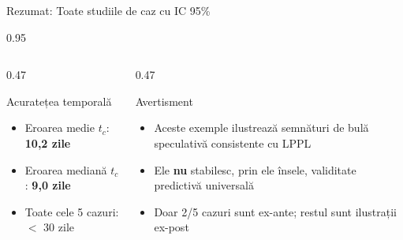\documentclass[9pt, aspectratio=169, t]{beamer}
\begin{document}
\begin{frame}{Rezumat: Toate studiile de caz cu IC 95\%}
\begin{cminipage}{0.95\textwidth}
{    \vspace{1mm}
    }
    {\footnotesize
    \begin{columns}[T]
        \begin{column}{0.47\textwidth}
            \begin{block}{Acuratețea temporală}
                \begin{itemize}\setlength{\itemsep}{0pt}
                    \item Eroarea medie $t_c$: \textbf{10,2 zile}
                    \item Eroarea mediană $t_c$: \textbf{9,0 zile}
                    \item Toate cele 5 cazuri: $<$ 30 zile
                \end{itemize}
            \end{block}
        \end{column}
        \begin{column}{0.47\textwidth}
            \begin{exampleblock}{Avertisment}
                \begin{itemize}\setlength{\itemsep}{0pt}
                    \item Aceste exemple ilustrează semnături de bulă speculativă consistente cu LPPL
                    \item Ele \textbf{nu} stabilesc, prin ele însele, validitate predictivă universală
                    \item Doar 2/5 cazuri sunt ex-ante; restul sunt ilustrații ex-post
                \end{itemize}
            \end{exampleblock}
        \end{column}
    \end{columns}
    }
    \end{cminipage}
\end{frame}

\end{document}
